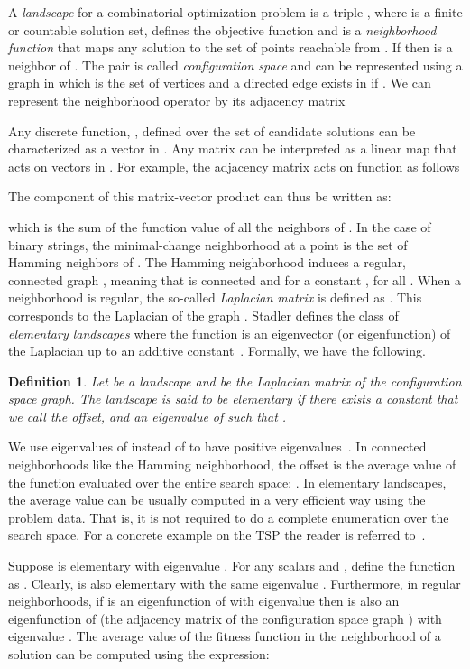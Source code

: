 \documentclass{article}
\newtheorem{definition}{Definition}
\begin{document}
A \emph{landscape} for a combinatorial optimization problem is a triple , where  is a finite or countable solution set,  defines the objective function and  is a \emph{neighborhood function} that maps any solution  to the set  of points reachable from . If  then  is a neighbor of .
The pair  is called \emph{configuration space} and can be represented using a graph  in which  is the set of vertices and a directed edge  exists in  if  \citep{Biyikoglu2007}.  We can represent the neighborhood operator by its adjacency matrix


Any discrete function, , defined over the set of candidate solutions can be characterized as a vector in . Any  matrix can be interpreted as a linear map that acts on vectors in . For example, the adjacency matrix  acts on function  as follows


The component  of this matrix-vector product can thus be written
as:

which is the sum of the function value of all the neighbors of . In the case of binary strings, the minimal-change neighborhood at a point  is the set of Hamming neighbors of . The Hamming neighborhood induces a regular, connected graph , meaning that  is connected and  for a constant , for all . When a neighborhood is regular, the so-called \emph{Laplacian matrix} is defined as . This corresponds to the Laplacian of the graph . Stadler defines the class of \emph{elementary landscapes} where the function  is an eigenvector (or eigenfunction) of the Laplacian up to an additive constant~\citep{Stadler1995landscapes}. Formally, we have the following.

\begin{definition}
Let  be a landscape and  be the Laplacian matrix of the configuration space graph. The landscape is said to be elementary if there exists a constant  that we call the \emph{offset}, and an eigenvalue  of  such that . 
\end{definition}

We use eigenvalues of  instead of  to have positive eigenvalues~\citep{Biyikoglu2007}. In connected neighborhoods like the Hamming neighborhood, the offset  is the average value of the function  evaluated over the entire search space: . In elementary landscapes, the average value  can be usually computed in a very efficient way using the problem data. That is, it is not required to do a complete enumeration over the search space. For a concrete example on the TSP the reader is referred to~\cite{Whitley2008}.

Suppose  is elementary with eigenvalue . For any scalars  and , define the function  as . Clearly,  is also elementary with the same eigenvalue . Furthermore, in regular neighborhoods, if  is an eigenfunction of  with eigenvalue  then  is also an eigenfunction of  (the adjacency matrix of the configuration space graph ) with eigenvalue . The average value of the fitness function in the neighborhood of a solution can be computed using the expression:
\end{document}
